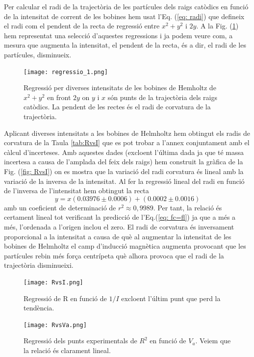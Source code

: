 \documentclass[11pt]{article}
\numberwithin{equation}{section}
\numberwithin{figure}{section}
\numberwithin{table}{section}
\begin{document}
Per calcular el radi de la trajectòria de les partícules dels raigs catòdics en funció de la intensitat de corrent de les bobines hem usat l'Eq. (\ref{eq: radi}) que defineix el radi com el pendent de la recta de regressió entre $x^2+y^2$ i $2y$. A la Fig. (\ref{fig: regressio_1}) hem representat una selecció d'aquestes regressions i ja podem veure com, a mesura que augmenta la intensitat, el pendent de la recta, és a dir, el radi de les partícules, disminueix. 
\begin{figure}[H]
    \centering
    \texttt{[image: regressio\_1.png]}
    \caption{Regressió per diverses intensitats de les bobines de Hemholtz de $x^2+y^2$ en front $2y$ on $y$ i $x$ són punts de la trajectòria dels raigs catòdics. La pendent de les rectes és el radi de corvatura de la trajectòria.}
    \label{fig: regressio_1}
\end{figure}
Aplicant diverses intensitats a les bobines de Helmholtz hem obtingut els radis de corvatura de la Taula \ref{tab:RvsI} que es pot trobar a l'annex conjuntament amb el càlcul d'incerteses. Amb aquestes dades (excloent l'última dada ja que té massa incertesa a causa de l'amplada del feix dels raigs) hem construit la gràfica de la Fig. (\ref{fig: RvsI}) on es mostra que la variació del radi corvatura és lineal amb la variació de la inversa de la intensitat. 
Al fer la regressió lineal del radi en funció de l'inversa de l'intensitat hem obtingut la recta
\begin{equation}
    y=x(0.03976\pm0.0006)+(0.0002\pm0.0016)
\end{equation}  
amb un coeficient de determinació de $r^2\approx0,9989$. Per tant, la relació és certament lineal tot verificant la predicció de l'Eq.(\ref{eq: fc=fl}) ja que a més a més, l'ordenada a l'origen inclou el zero. El radi de corvatura és inversament proporcional a la intensitat a causa de què al augmentar la intensitat de les bobines de Helmholtz el camp d'inducció magnètica augmenta provocant que les partícules rebin més força centrípeta què alhora provoca que el radi de la trajectòria disminueixi.
\begin{figure}[h]
    \centering
    \begin{minipage}{0.45\textwidth}
        \centering
        \texttt{[image: RvsI.png]}
        \caption{Regressió de R en funció de $1/I$ excloent l'últim punt que perd la tendència.}
        \label{fig: RvsI}
    \end{minipage}
    \hfill
    \begin{minipage}{0.45\textwidth} 
        \centering
        \texttt{[image: RvsVa.png]}
        \caption{Regressió dels punts experimentals de $R^2$ en funció de $V_a$. Veiem que la relació és clarament lineal.}
        \label{fig: RvsVa}
    \end{minipage}
\end{figure}
\end{document}
